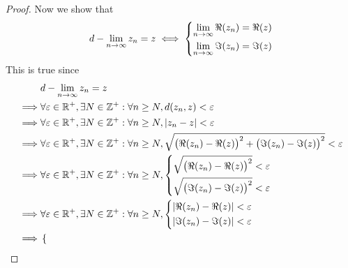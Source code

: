 \begin{proof}
  Now we show that
  \[
    d - \lim_{n \to \infty} z_n = z \iff \begin{dcases}
      \lim_{n \to \infty} \Re(z_n) = \Re(z) \\
      \lim_{n \to \infty} \Im(z_n) = \Im(z)
    \end{dcases}
  \]
  This is true since
  \begin{align*}
             & d - \lim_{n \to \infty} z_n = z                                                                                                                         \\
    \implies & \forall \varepsilon \in \R^+, \exists N \in \Z^+ : \forall n \geq N, d(z_n, z) < \varepsilon                                                            \\
    \implies & \forall \varepsilon \in \R^+, \exists N \in \Z^+ : \forall n \geq N, \abs{z_n - z} < \varepsilon                                                        \\
    \implies & \forall \varepsilon \in \R^+, \exists N \in \Z^+ : \forall n \geq N, \sqrt{\big(\Re(z_n) - \Re(z)\big)^2 + \big(\Im(z_n) - \Im(z)\big)^2} < \varepsilon \\
    \implies & \forall \varepsilon \in \R^+, \exists N \in \Z^+ : \forall n \geq N, \begin{dcases}
                                                                                      \sqrt{\big(\Re(z_n) - \Re(z)\big)^2} < \varepsilon \\
                                                                                      \sqrt{\big(\Im(z_n) - \Im(z)\big)^2} < \varepsilon
                                                                                    \end{dcases}                                 \\
    \implies & \forall \varepsilon \in \R^+, \exists N \in \Z^+ : \forall n \geq N, \begin{dcases}
                                                                                      \abs{\Re(z_n) - \Re(z)} < \varepsilon \\
                                                                                      \abs{\Im(z_n) - \Im(z)} < \varepsilon
                                                                                    \end{dcases}                                              \\
    \implies & \begin{dcases}

\end{dcases}
\end{align*}
\end{proof}
